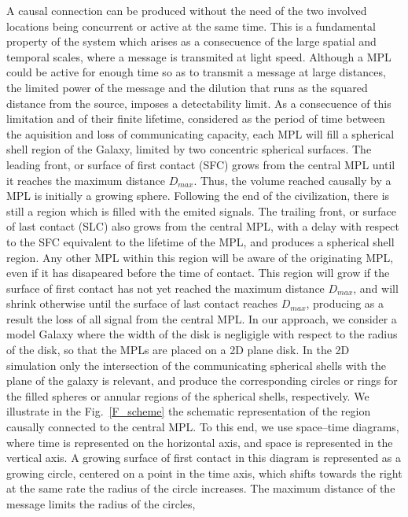 \documentclass[crop]{CSLB}%
\begin{document}
A causal connection can be produced without the need of the two
involved locations being concurrent or active at the same time.
%
This is a fundamental property of the system which arises as a
consecuence of the large spatial and temporal scales, where a message
is transmited at light speed.
%
Although a MPL could be active for enough time so as to transmit a
message at large distances, the limited power of the message and the
dilution that runs as the squared distance from the source, imposes a
detectability limit.
%
As a consecuence of this limitation and of their finite lifetime,
considered as the period of time between the aquisition and loss of
communicating capacity, each MPL will fill a spherical shell region of
the Galaxy, limited by two concentric spherical surfaces.
%
The leading front, or surface of first contact (SFC) grows from the
central MPL until it reaches the maximum distance $D_{max}$.
%
Thus, the volume reached causally by a MPL is initially a growing
sphere.
%
Following the end of the civilization, there is still a region which
is filled with the emited signals.
%
The trailing front, or surface of last contact (SLC) also grows from
the central MPL, with a delay with respect to the SFC equivalent to
the lifetime of the MPL, and produces a spherical shell region.
%
Any other MPL within this region will be aware of the originating MPL,
even if it has disapeared before the time of contact.
%
This region will grow if the surface of first contact has not yet
reached the maximum distance $D_{max}$, and will shrink otherwise
until the surface of last contact reaches $D_{max}$, producing as a
result the loss of all signal from the central MPL.
%
In our approach, we consider a model Galaxy where the width of the
disk is negligigle with respect to the radius of the disk, so that the
MPLs are placed on a 2D plane disk.
%
In the 2D simulation only the intersection of the communicating
spherical shells with the plane of the galaxy is relevant, and produce
the corresponding circles or rings for the filled spheres or annular
regions of the spherical shells, respectively.
%
We illustrate in the Fig.~\ref{F_scheme} the schematic representation
of the region causally connected to the central MPL.
%
To this end, we use space--time diagrams, where time is represented on
the horizontal axis, and space is represented in the vertical axis.
%
A growing surface of first contact in this diagram is represented as a
growing circle, centered on a point in the time axis, which shifts
towards the right at the same rate the radius of the circle increases.
%
The maximum distance of the message limits the radius of the circles,
\end{document}
